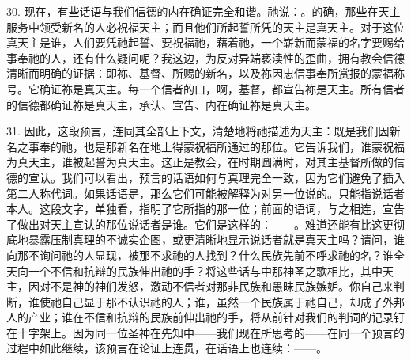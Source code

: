 30. 现在，有些话语与我们信德的内在确证完全和谐。祂说：。的确，那些在天主服务中领受新名的人必祝福天主；而且他们所起誓所凭的天主是真天主。对于这位真天主是谁，人们要凭祂起誓、要祝福祂，藉着祂，一个崭新而蒙福的名字要赐给事奉祂的人，还有什么疑问呢？我这边，为反对异端亵渎性的歪曲，拥有教会信德清晰而明确的证据：即祢、基督、所赐的新名，以及祢因忠信事奉所赏报的蒙福称号。它确证祢是真天主。每一个信者的口，啊，基督，都宣告祢是天主。所有信者的信德都确证祢是真天主，承认、宣告、内在确证祢是真天主。\par

31. 因此，这段预言，连同其全部上下文，清楚地将祂描述为天主：既是我们因新名之事奉的祂，也是那新名在地上得蒙祝福所通过的那位。它告诉我们，谁蒙祝福为真天主，谁被起誓为真天主。这正是教会，在时期圆满时，对其主基督所做的信德的宣认。我们可以看出，预言的话语如何与真理完全一致，因为它们避免了插入第二人称代词。如果话语是，那么它们可能被解释为对另一位说的。只能指说话者本人。这段文字，单独看，指明了它所指的那一位；前面的语词，与之相连，宣告了做出对天主宣认的那位说话者是谁。它们是这样的：——。难道还能有比这更彻底地暴露压制真理的不诚实企图，或更清晰地显示说话者就是真天主吗？请问，谁向那不询问祂的人显现，被那不求祂的人找到？什么民族先前不呼求祂的名？谁全天向一个不信和抗辩的民族伸出祂的手？将这些话与中那神圣之歌相比，其中天主，因对不是神的神们发怒，激动不信者对那非民族和愚昧民族嫉妒。你自己来判断，谁使祂自己显于那不认识祂的人；谁，虽然一个民族属于祂自己，却成了外邦人的产业；谁在不信和抗辩的民族前伸出祂的手，将从前针对我们的判词的记录钉在十字架上。因为同一位圣神在先知中——我们现在所思考的——在同一个预言的过程中如此继续，该预言在论证上连贯，在话语上也连续：——。\par

